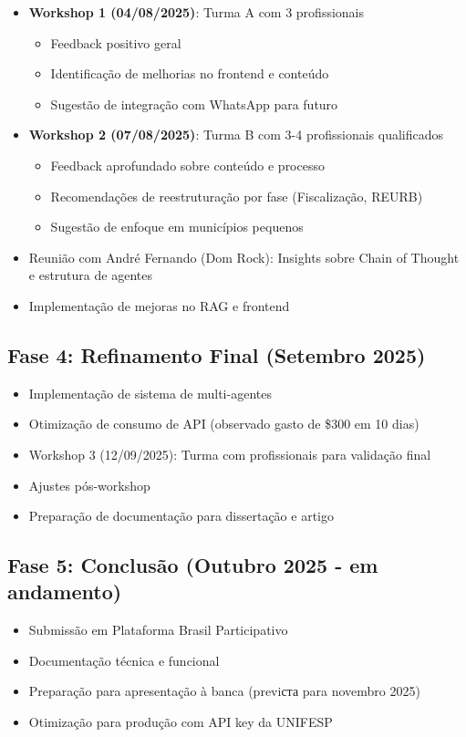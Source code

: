 \documentclass[12pt,a4paper]{report}
\begin{document}
\begin{itemize}
  \item \textbf{Workshop 1 (04/08/2025)}: Turma A com 3 profissionais
  \begin{itemize}
    \item Feedback positivo geral
    \item Identificação de melhorias no frontend e conteúdo
    \item Sugestão de integração com WhatsApp para futuro
  \end{itemize}
  \item \textbf{Workshop 2 (07/08/2025)}: Turma B com 3-4 profissionais qualificados
  \begin{itemize}
    \item Feedback aprofundado sobre conteúdo e processo
    \item Recomendações de reestruturação por fase (Fiscalização, REURB)
    \item Sugestão de enfoque em municípios pequenos
  \end{itemize}
  \item Reunião com André Fernando (Dom Rock): Insights sobre Chain of Thought e estrutura de agentes
  \item Implementação de mejoras no RAG e frontend
\end{itemize}

\subsection{Fase 4: Refinamento Final (Setembro 2025)}

\begin{itemize}
  \item Implementação de sistema de multi-agentes
  \item Otimização de consumo de API (observado gasto de \$300 em 10 dias)
  \item Workshop 3 (12/09/2025): Turma com profissionais para validação final
  \item Ajustes pós-workshop
  \item Preparação de documentação para dissertação e artigo
\end{itemize}

\subsection{Fase 5: Conclusão (Outubro 2025 - em andamento)}

\begin{itemize}
  \item Submissão em Plataforma Brasil Participativo
  \item Documentação técnica e funcional
  \item Preparação para apresentação à banca (previста para novembro 2025)
  \item Otimização para produção com API key da UNIFESP
\end{itemize}
\end{document}

